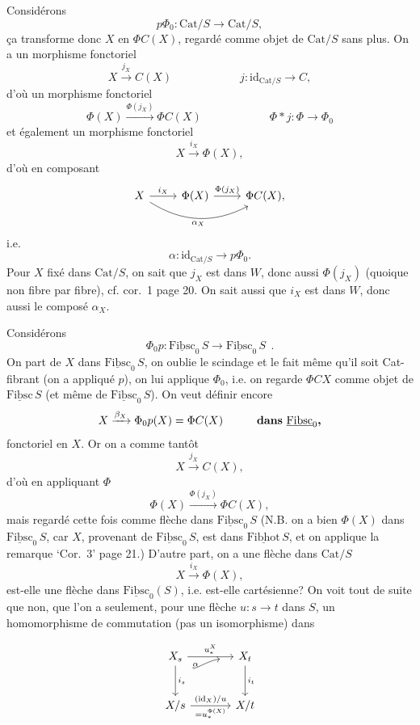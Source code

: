 \documentclass[11pt]{article}
\newcommand{\printedpage}[1]{\marginpar{\footnotesize p.~#1}}
\newcommand{\msp}[1]{\marginpar{\footnotesize [#1]}}
\newcommand{\und}[1]{\underline{\mathrm{#1}}}
\newcommand{\Cat}{\mathrm{Cat}}
\begin{document}
\msp{page 29}
Considérons
\[ p\Phi_0 : \Cat/S \longrightarrow \Cat/S, \]
ça transforme donc $X$ en $\Phi C(X)$, regardé comme objet de $\Cat/S$ sans plus. On a un morphisme fonctoriel
\[ X \xrightarrow{j_X} C(X) \qquad\qquad\qquad j : \mathrm{id}_{\Cat/S} \longrightarrow C, \]
\printedpage{18}
d'où un morphisme fonctoriel
\[ \Phi(X) \xrightarrow{\Phi(j_X)} \Phi C(X) \qquad\qquad\qquad \Phi * j : \Phi \longrightarrow \Phi_0 \]
et également un morphisme fonctoriel
\[ X \xrightarrow{i_X} \Phi(X), \]
d'où en composant
\[
\begin{tikzcd}
X \arrow[r, "i_X"] \arrow[rr, bend right, "\alpha_X"'] & \Phi(X) \arrow[r, "\Phi(j_X)"] & \Phi C(X),
\end{tikzcd}
\]
i.e.
\[ \alpha : \mathrm{id}_{\Cat/S} \longrightarrow p\Phi_0. \]
Pour $X$ fixé dans $\Cat/S$, on sait que $j_X$ est dans $W$, donc aussi $\Phi(j_X)$ (quoique non fibre par fibre), cf. cor.~1 page 20. On sait aussi que $i_X$ est dans $W$, donc aussi le composé $\alpha_X$.

Considérons
\[ \Phi_0 p : \und{Fibsc}_0\,S \longrightarrow \und{Fibsc}_0\,S\ \ . \]
On part de $X$ dans $\und{Fibsc}_0\,S$, on oublie le scindage et le fait même qu'il soit Cat-fibrant
\msp{page 30}
(on a appliqué $p$), on lui applique $\Phi_0$, i.e. on regarde $\Phi CX$ comme objet de $\und{Fibsc}\,S$ (et même de $\und{Fibsc}_0\,S$). On veut définir encore
\[ X \xrightarrow{\beta_X} \Phi_0 p(X) = \Phi C(X) \qquad\quad \text{\textbf{dans} } \und{Fibsc}_0\text{\textbf{,}} \] %
fonctoriel en $X$. Or on a comme tantôt
\[ X \xrightarrow{j_X} C(X), \]
d'où en appliquant $\Phi$
\[ \Phi(X) \xrightarrow{\Phi(j_X)} \Phi C(X), \]
mais regardé cette fois comme flèche dans $\und{Fibsc}_0\,S$ (N.B. on a bien $\Phi(X)$ dans $\und{Fibsc}_0\,S$, car $X$, provenant de $\und{Fibsc}_0\,S$, est dans $\und{Fibhot}\,S$, et on applique la remarque `Cor.~3' page 21.) D'autre part, on a une flèche dans $\Cat/S$
\[ X \xrightarrow{i_X} \Phi(X), \]
est-elle une flèche dans $\und{Fibsc}_0(S)$, i.e. est-elle cartésienne? On voit tout de suite que non, que l'on a seulement, pour une flèche $u : s \longrightarrow t$ dans $S$, un homomorphisme de commutation (pas un isomorphisme) dans

\printedpage{19}

\[
\begin{tikzcd}[row sep=large, column sep=large]
X_s \arrow[r, "u_*^X"] \arrow[d, "i_s"] & X_t \arrow[d, "i_t"] \\
X/s \arrow[r, "(\mathrm{id}_X)/u", "= u_*^{\Phi(X)}"'] \arrow[ur, bend left=30, shorten <=28pt, shorten >=12pt, "\alpha"] & X/t
\end{tikzcd}
\]
\end{document}
